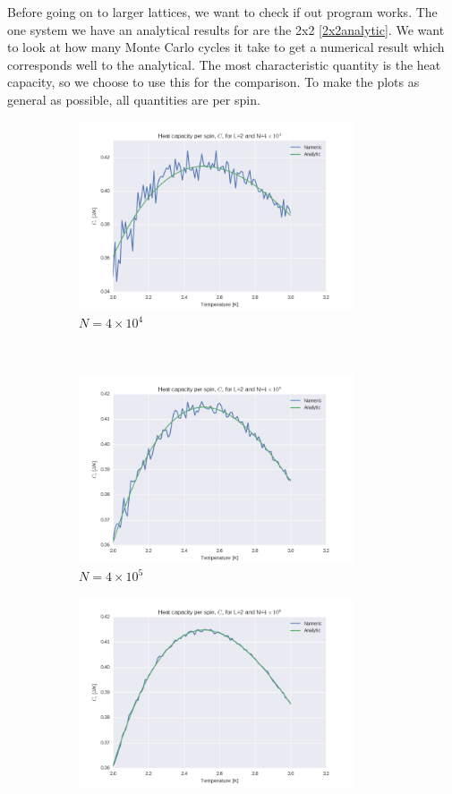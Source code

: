 \documentclass[a4paper, 10pt]{article}
\begin{document}
Before going on to larger lattices, we want to check if out program works. The one system we have an analytical results for are the 2x2 \ref{2x2analytic}. We want to look at how many Monte Carlo cycles it take to get a numerical result which corresponds well to the analytical. The most characteristic quantity is the heat capacity, so we choose to use this for the comparison. To make the plots as general as possible, all quantities  are per spin.

\begin{figure}[!ht]
    \centering
    \begin{subfigure}[H!]{0.5\textwidth}
        \centering
        \includegraphics[height=2.2in]{L2Cv4e4.png}
        \caption{$N=4\times 10^4$}
    \end{subfigure}%
    ~ 
    \begin{subfigure}[H!]{0.5\textwidth}
        \centering
        \includegraphics[height=2.2in]{L2Cv4e5.png}
        \caption{$N=4\times 10^5$}
    \end{subfigure}
    \begin{subfigure}[H!]{0.5\textwidth}
        \centering
        \includegraphics[height=2.2in]{L2Cv4e6.png}

\end{subfigure}
\end{figure}
\end{document}
